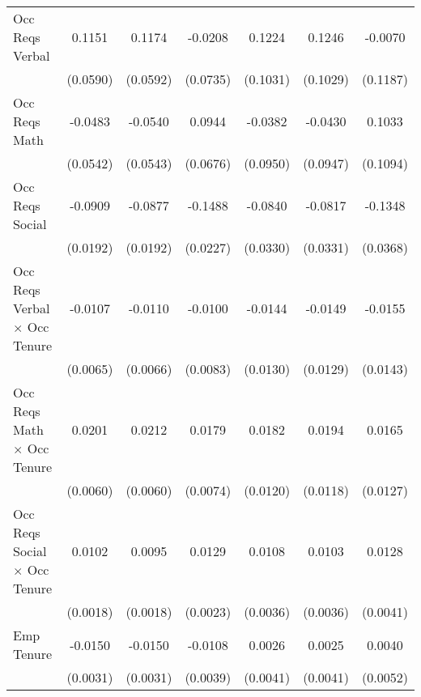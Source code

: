 {\begin{longtable}{l*{6}{c}}
Occ Reqs Verbal     &      0.1151\sym{*}  &      0.1174\sym{**} &     -0.0208         &      0.1224         &      0.1246         &     -0.0070         \\
                    &    (0.0590)         &    (0.0592)         &    (0.0735)         &    (0.1031)         &    (0.1029)         &    (0.1187)         \\
Occ Reqs Math       &     -0.0483         &     -0.0540         &      0.0944         &     -0.0382         &     -0.0430         &      0.1033         \\
                    &    (0.0542)         &    (0.0543)         &    (0.0676)         &    (0.0950)         &    (0.0947)         &    (0.1094)         \\
Occ Reqs Social     &     -0.0909\sym{***}&     -0.0877\sym{***}&     -0.1488\sym{***}&     -0.0840\sym{**} &     -0.0817\sym{**} &     -0.1348\sym{***}\\
                    &    (0.0192)         &    (0.0192)         &    (0.0227)         &    (0.0330)         &    (0.0331)         &    (0.0368)         \\
Occ Reqs Verbal $\times$ Occ Tenure&     -0.0107\sym{*}  &     -0.0110\sym{*}  &     -0.0100         &     -0.0144         &     -0.0149         &     -0.0155         \\
                    &    (0.0065)         &    (0.0066)         &    (0.0083)         &    (0.0130)         &    (0.0129)         &    (0.0143)         \\
Occ Reqs Math $\times$ Occ Tenure&      0.0201\sym{***}&      0.0212\sym{***}&      0.0179\sym{**} &      0.0182         &      0.0194\sym{*}  &      0.0165         \\
                    &    (0.0060)         &    (0.0060)         &    (0.0074)         &    (0.0120)         &    (0.0118)         &    (0.0127)         \\
Occ Reqs Social $\times$ Occ Tenure&      0.0102\sym{***}&      0.0095\sym{***}&      0.0129\sym{***}&      0.0108\sym{***}&      0.0103\sym{***}&      0.0128\sym{***}\\
                    &    (0.0018)         &    (0.0018)         &    (0.0023)         &    (0.0036)         &    (0.0036)         &    (0.0041)         \\
Emp Tenure          &     -0.0150\sym{***}&     -0.0150\sym{***}&     -0.0108\sym{***}&      0.0026         &      0.0025         &      0.0040         \\
                    &    (0.0031)         &    (0.0031)         &    (0.0039)         &    (0.0041)         &    (0.0041)         &    (0.0052)         \\

\end{longtable}}
